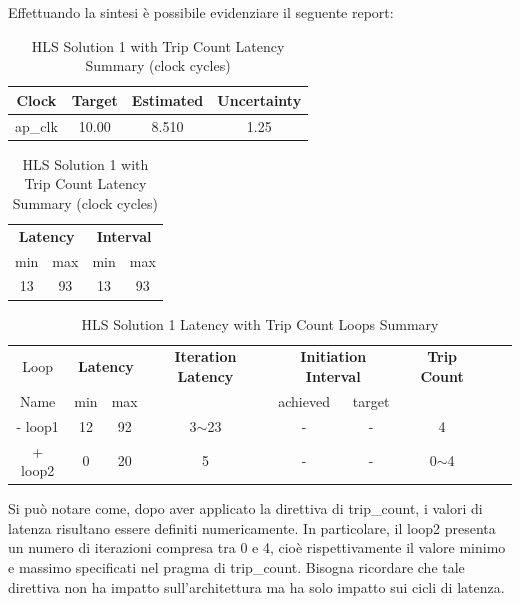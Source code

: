 Effettuando la sintesi è possibile evidenziare il seguente report:\\
\begin{table}[H]
	\centering
	\begin{minipage}[t]{0.45\linewidth}
		\centering
		\begin{tabular}{|c|c|c|c|}
			\hline
			\textbf{Clock} & \textbf{Target} & \textbf{Estimated} & \textbf{Uncertainty} \\
			\hline
			ap\_clk & 10.00 & 8.510 & 1.25 \\
			\hline
		\end{tabular}
		\caption{HLS Solution 1 with Trip Count Timing Summary (ns)}
		\label{tab:hls-solution-1-timing-summary}
	\end{minipage}
	\hfill
	\begin{minipage}[t]{0.45\linewidth}
		\centering
		\begin{tabular}{|c|c|c|c|}
			\hline
			\multicolumn{2}{|c|}{\textbf{Latency}} & \multicolumn{2}{|c|}{\textbf{Interval}} \\
			min & max & min & max \\
			\hline
			13 & 93 & 13 & 93 \\
			\hline
		\end{tabular}
		\caption{HLS Solution 1 with Trip Count Latency Summary (clock cycles)}
		\label{tab:hls-solution-1-latency-summary}
	\end{minipage}
\end{table}

\begin{table}[H]
	\centering
	\begin{tabular}{|c|c|c|c|c|c|c|c|c|}
		\hline
		\multicolumn{1}{|c|}{Loop} & \multicolumn{2}{|c|}{\textbf{Latency}} & \multicolumn{1}{c|}{\textbf{Iteration Latency}} & \multicolumn{2}{c|}{\textbf{Initiation Interval}} & \multicolumn{1}{c|}{\textbf{Trip Count}}  \\
		Name & min & max & & achieved & target &  \\
		\hline
		- loop1 & 12 & 92 & 3$\sim$23 & - & - & 4 \\
		+ loop2 & 0 & 20 & 5 & - & - & 0$\sim$4 \\
		\hline
	\end{tabular}
	\caption{HLS Solution 1 Latency with Trip Count Loops Summary }
	\label{tab:hls-solution-1-loop-summary}
\end{table}

Si può notare come, dopo aver applicato la direttiva di trip\_count, i valori di latenza risultano essere definiti numericamente. In particolare, il loop2 presenta un numero di iterazioni compresa tra 0 e 4, cioè rispettivamente il valore minimo e massimo specificati nel pragma di trip\_count. Bisogna ricordare che tale direttiva non ha impatto sull'architettura ma ha solo impatto sui cicli di latenza.

